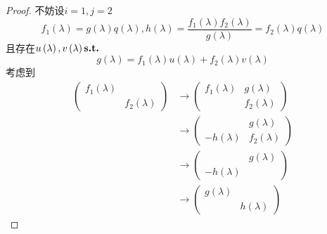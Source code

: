 {\begin{proof}
        不妨设$i=1,j=2$\[f_1\left(\lambda\right)=g\left(\lambda\right)q\left(\lambda\right),h\left(\lambda\right)=\frac{
                f_1\left(\lambda\right)f_2\left(\lambda\right)
            }{g\left(\lambda\right)}=f_2\left(\lambda\right)q\left(\lambda\right)\]且存在$u\left(\lambda\right),v\left(\lambda\right)\textup{\bfseries{s.t.}}$\[
            g\left(\lambda\right)=f_1\left(\lambda\right)u\left(\lambda\right)+f_2\left(\lambda\right)v\left(\lambda\right)
        \]考虑到\begin{align*}
            \begin{pmatrix}
                f_1\left(\lambda\right) &                         \\
                                        & f_2\left(\lambda\right)
            \end{pmatrix} & \longrightarrow
            \begin{pmatrix}
                f_1\left(\lambda\right) & g\left(\lambda\right)   \\
                                        & f_2\left(\lambda\right)
            \end{pmatrix}                                                                    \\
                                                                 & \longrightarrow
            \begin{pmatrix}
                                       & g\left(\lambda\right)   \\
                -h\left(\lambda\right) & f_2\left(\lambda\right)
            \end{pmatrix}                                                                     \\
                                                                 & \longrightarrow\begin{pmatrix}
                                                                                                             & g\left(\lambda\right) \\
                                                                                      -h\left(\lambda\right) &
                                                                                  \end{pmatrix} \\
                                                                 & \longrightarrow\begin{pmatrix}
                                                                                      g\left(\lambda\right) &                       \\
                                                                                                            & h\left(\lambda\right)
                                                                                  \end{pmatrix}
        \end{align*}


\end{proof}}
